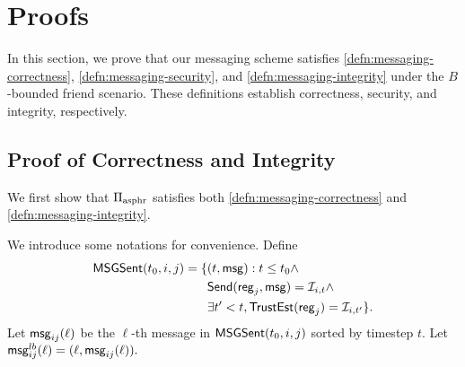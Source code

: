 \section{Proofs}
\label{sec:proofs}
In this section, we prove that our messaging scheme satisfies \cref{defn:messaging-correctness}, \cref{defn:messaging-security}, and \cref{defn:messaging-integrity} under the $B$-bounded friend scenario. These definitions establish correctness, security, and integrity, respectively.
\subsection{Proof of Correctness and Integrity}
We first show that $\Pi_{\text{asphr}}$ satisfies both \cref{defn:messaging-correctness} and \cref{defn:messaging-integrity}.

We introduce some notations for convenience. Define
\begin{align*}
    \mathsf{MSGSent}(t_0, i, j) = \{&(t, \mathsf{msg}): t \leq t_0 \land \\
    &\mathsf{Send}(\mathsf{reg}_j, \mathsf{msg}) = \mathcal{I}_{i, t} \land \\
             &\exists t' < t, \mathsf{TrustEst}(\mathsf{reg}_j) = \mathcal{I}_{i, t'}\}.
\end{align*}
Let $\mathsf{msg}_{ij}(\ell)$ be the $\ell$-th message in $\mathsf{MSGSent}(t_0, i, j)$ sorted by timestep $t$. Let $\mathsf{msg}_{ij}^{lb}(\ell) = (\ell, \mathsf{msg}_{ij}(\ell)).$


